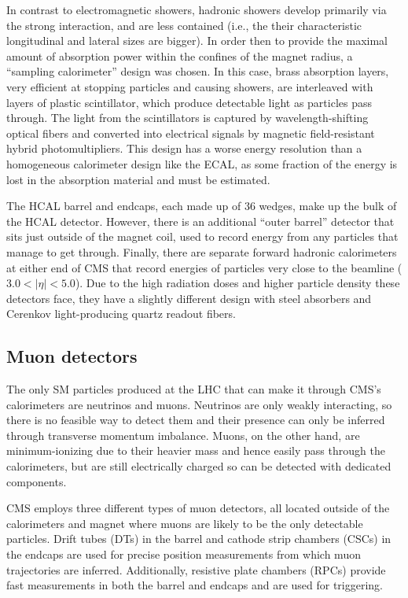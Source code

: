 In contrast to electromagnetic showers, hadronic showers develop primarily via the
strong interaction, and are less contained (i.e., the their characteristic longitudinal
and lateral sizes are bigger). In order then to provide the maximal amount of absorption
power within the confines of the magnet radius, a ``sampling calorimeter'' design
was chosen. In this case, brass absorption layers, very efficient at stopping particles
and causing showers, are interleaved with layers of plastic scintillator, which
produce detectable light as particles pass through. The light from the scintillators
is captured by wavelength-shifting optical fibers
and converted into electrical signals by magnetic field-resistant hybrid photomultipliers.
This design has a worse energy resolution than a homogeneous calorimeter design like the ECAL, as some 
fraction of the energy is lost in the absorption material and must be estimated.

The HCAL barrel and endcaps, each made up of 36 wedges, make up the bulk of the HCAL detector.
However, there is an additional ``outer barrel'' detector that sits just outside of the magnet
coil, used to record energy from any particles that manage to get through. Finally,
there are separate forward hadronic calorimeters at either end of CMS that record energies
of particles very close to the beamline ($3.0 < |\eta| < 5.0$). Due to the high radiation
doses and higher particle density these detectors face, they have a slightly different
design with steel absorbers and Cerenkov light-producing quartz readout fibers.


\subsection{Muon detectors}

The only SM particles produced at the LHC that can make it through CMS's calorimeters
are neutrinos and muons. Neutrinos are only weakly interacting, so there is no feasible way to
detect them and their presence can only be inferred through transverse momentum imbalance.
Muons, on the other hand, are minimum-ionizing due to their heavier mass and hence easily
pass through the calorimeters, but are still electrically charged so can be detected with
dedicated components.

CMS employs three different types of muon detectors, all located outside of the calorimeters
and magnet where muons are likely to be the only detectable particles. Drift tubes (DTs) in 
the barrel and cathode strip chambers (CSCs) in the endcaps are used for precise position
measurements from which muon trajectories are inferred. Additionally, resistive plate
chambers (RPCs) provide fast measurements in both the barrel and endcaps and are
used for triggering.

